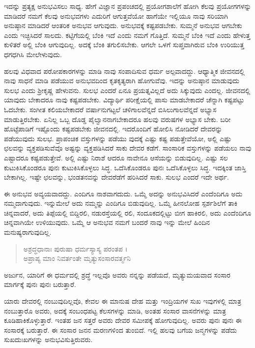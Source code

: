 ಇದನ್ನು ಪ್ರತ್ಯಕ್ಷ ಅನುಭವಿಸಲು ಸಾಧ್ಯ. ಹೇಗೆ ವಿಜ್ಞಾನ ಪ್ರಪಂಚದಲ್ಲಿ ಪ್ರಯೋಗಶಾಲೆಗೆ ಹೋಗಿ ಕೆಲವು ಪ್ರಯೋಗಗಳನ್ನು ಮಾಡಿದರೆ ನಮಗೆ ಕೆಲವು ಅನುಭವಗಳು ಎದುರಿಗೆ ಆಗುತ್ತವೆಯೋ ಹಾಗೆಯೇ ಇಲ್ಲಿಯೂ ನಾವು ಸರಿಯಾಗಿ ಅನುಷ್ಠಾನ ಮಾಡಿದರೆ ಆಂತರಿಕ ಅನುಭವ ಆಗುವುದು. ಅನುಭವಕ್ಕೆ ಕಷ್ಟಪಡಬೇಕು. ಸುಮ್ಮನೆ ಅನುಭವ ಆಗಬೇಕು ಎಂದು ಇಚ್ಛಿಸಿದರೆ ಸಾಲದು. ಕಟ್ಟಿಗೆಯಲ್ಲಿ ಬೆಂಕಿ ಇದೆ ಎಂದು ನಮಗೆ ಗೊತ್ತಿದೆ. ಸುಮ್ಮನೆ ಬೆಂಕಿ ಇದೆ ಎಂದು ಹೇಳುತ್ತ ಕುಳಿತರೆ ಅಲ್ಲಿ ಬೆಂಕಿ ಆಗುವುದಿಲ್ಲ. ಅದಕ್ಕೆ ಬೆಂಕಿ ತಗುಲಿಸಬೇಕು. ಆಗಲೇ ಒಳಗೆ ಸುಪ್ತವಾಗಿರುವ ಬೆಂಕಿ ಉರಿಯುತ್ತ ಧಗಧಗಿಸಿ ಮೇಲೇಳುವುದು.

ಹಲವು ವಿಧವಾದ ಪರೋಪಕಾರಗಳನ್ನು ಮಾಡಿ ನಾವು ಸಂಪಾದಿಸುವ ಧರ್ಮ ಅಲ್ಪವಾದದ್ದು. ಆಧ್ಯಾತ್ಮಿಕ ಜೀವನದಲ್ಲಿ ನಾವು ಸಾಧನೆ ಮಾಡಿ ಪಡೆಯುವ ಅನುಭವದಿಂದ ಕೃತಕೃತ್ಯರಾಗಿ ಹೋಗುವೆವು. ಇದನ್ನು ಅನುಷ್ಠಾನ ಮಾಡುವುದು ಸುಲಭ ಎಂದು ಶ್ರೀಕೃಷ್ಣ ಹೇಳುವನು. ಸುಲಭ ಎಂದರೆ ಏನೂ ಪ್ರಯತ್ನವಿಲ್ಲದೆ ಅದು ಸಿಕ್ಕುವುದು ಎಂದಲ್ಲ. ಜೀವನದಲ್ಲಿ ಯಾವುದು ಬೇಕಾದರೂ ನಾವು ಕಷ್ಟಪಡಬೇಕು. ವಿದ್ಯಾರ್ಥಿ ಪರೀಕ್ಷೆಯಲ್ಲಿ ಪಾಸು ಮಾಡಬೇಕಾದರೆ ಚೆನ್ನಾಗಿ ಕಷ್ಟಪಟ್ಟು ಓದಬೇಕು. ಸಂಗೀತ ಕಲಿಯಬೇಕಾದರೆ ವರ್ಷಾನುಗಟ್ಟಲೆ ಚಳಿಗಾಲವೆನ್ನದೆ ಬಿಸಿಲುಗಾಲವೆನ್ನದೆ ಅಭ್ಯಾಸ ಮಾಡುತ್ತಿರಬೇಕು. ಏನಿಲ್ಲ ಒಬ್ಬ ದೊಡ್ಡ ಪೈಲ್ವಾನನಾಗಬೇಕಾದರೂ ಹಲವು ವರುಷಗಳ ಅಭ್ಯಾಸ ಬೇಕು. ಬರೀ ಹೊಟ್ಟೆಪಾಡಿಗೆ ಇಷ್ಟೊಂದು ಕಷ್ಟಪಡಬೇಕು ಜೀವನದಲ್ಲಿ. ಇದರೊಂದಿಗೆ ಹೋಲಿಸಿ ನೋಡಿದರೆ ದೇವರನ್ನು ಪಡೆಯುವುದು ಸುಲಭ. ಪ್ರಾಪಂಚಿಕ ವಸ್ತುಗಳನ್ನು ಪಡೆಯು ವುದಕ್ಕೆ ಎಷ್ಟು ಕಷ್ಟ ಪಡುತ್ತೇವೆಯೋ, ಅಲ್ಲಿ ಎಷ್ಟು ಛಲವನ್ನು ವ್ಯಕ್ತಪಡಿಸುವೆವೊ ಅಷ್ಟನ್ನು ವ್ಯಕ್ತಪಡಿಸಿದರೆ ಸಾಕು ದೇವರ ಕಡೆಗೆ. ಸಾಂಸಾರಿಕ ವಸ್ತುಗಳನ್ನು ಪಡೆಯಲು ನಾವು ಎಷ್ಟಾದರೂ ಕಷ್ಟಪಡುತ್ತೇವೆ. ಅಲ್ಲಿ ಎಷ್ಟು ನಿರಾಶೆ ಆದರೂ ನಾವೇನೂ ಆಸೆಯನ್ನು ಬಿಡುವುದಿಲ್ಲ. ಎಷ್ಟು ಸಲ ಕುಟುಕಿಸಿಕೊಂಡರೂ ಪುನಃ ಕುಟುಕಿಸಿಕೊಳ್ಳಲು ಸಿದ್ಧ. ಒದೆಸಿಕೊಂಡರೂ ಪುನಃ ಒದೆಸಿಕೊಳ್ಳಲು ಸಿದ್ಧ. ಇದಕ್ಕಿಂತ ಜಾಸ್ತಿ ಬೇಕಾಗಿಲ್ಲ. ಇಷ್ಟೇ ಛಲವನ್ನು, ಭಂಡತನವನ್ನು ದೇವರೆಡೆಗೆ ಹರಿಸಿದರೆ ಸಾಕು. ಸುಲಭ ಎಂದರೆ ಇದೇ ಅರ್ಥ.

ಈ ಅನುಭವ ಅವ್ಯಯವಾದದ್ದು. ಎಂದಿಗೂ ನಾಶವಾಗದುದು. ಒಮ್ಮೆ ಅದನ್ನು ಅನುಭವಿಸಿದರೆ ಎಂದೆಂದಿಗೂ ಅದು ನಮ್ಮದಾಗುವುದು. ಇನ್ನುಮೇಲೆ ಅದು ನಮ್ಮನ್ನು ಎಂದಿಗೂ ಬಿಡುವುದಿಲ್ಲ. ಒಮ್ಮೆ ಹೀನಲೋಹ ಸ್ಪರ್ಶಶಿಲೆಗೆ ತಾಕಿ ಚಿನ್ನವಾದರೆ, ಅದು ತಿಪ್ಪೆಯಲ್ಲಿ ಬಿದ್ದಿರಲಿ, ನಡುರಸ್ತೆಯಲ್ಲಿ ರಲಿ, ಸಂದೂಕದಲ್ಲಿಟ್ಟು ಬೀಗ ಹಾಕಿರಲಿ, ಅದು ಎಂದೆಂದಿಗೂ ಚಿನ್ನವಾಗಿಯೇ ಉಳಿಯುವುದು. ಒಮ್ಮೆ ಆ ಅನುಭವ ನಮಗೆ ಬಂದರೆ ನಾವು ಇನ್ನು ಮೇಲೆ ಹಿಂದಿನ ಮನುಷ್ಯರಾಗುವುದಿಲ್ಲ.

\begin{verse}
ಅಶ್ರದ್ಧಧಾನಾಃ ಪುರುಷಾ ಧರ್ಮಸ್ಯಾಸ್ಯ ಪರಂತಪ ।\\ಅಪ್ರಾಪ್ಯ ಮಾಂ ನಿವರ್ತಂತೇ ಮೃತ್ಯುಸಂಸಾರವರ್ತ್ಮನಿ 
\end{verse}

{\small ಅರ್ಜುನ, ಯಾರಿಗೆ ಈ ಧರ್ಮದಲ್ಲಿ ಶ್ರದ್ಧೆ ಇಲ್ಲವೊ ಅವರು ನನ್ನನ್ನು ಪಡೆಯದೆ, ಮೃತ್ಯುಮಯವಾದ ಸಂಸಾರ ಮಾರ್ಗಕ್ಕೆ ಪುನಃ ಪುನಃ ಬರುತ್ತಾರೆ.}

ಯಾರು ದೇವರಲ್ಲಿ ನಂಬುವುದಿಲ್ಲವೊ, ಕೇವಲ ಈ ಮಾನುಷ ದೇಹ ಮತ್ತು ಇಂದ್ರಿಯಗಳ ಸುಖ ಇವುಗಳಲ್ಲಿ ಮಾತ್ರ ನಂಬುತ್ತಾರೊ ಅವರು, ಅದಕ್ಕೆ ಸಂಬಂಧಪಟ್ಟ ಕೆಲಸಗಳನ್ನು ಮಾಡಿ, ಅಂತಹ ಸಂಸಾರ ವಾಸನೆಗಳನ್ನು ಮಾತ್ರ ಕೂಡಿಹಾಕಿಕೊಳ್ಳುತ್ತಾರೆ. ಇಂತಹ ಜನ ಸತ್ತರೆ ಅವರು ದೇವರ ಸಮೀಪಕ್ಕೆ ಹೋಗುವುದಿಲ್ಲ. ಅವರು ಪುನಃ ಪುನಃ ಈ ಸಂಸಾರಕ್ಕೆ ಬರುತ್ತಾರೆ. ಈ ಸಂಸಾರ ಜನನ ಮರಣಗಳಿಂದ ತುಂಬಿದೆ. ಇಲ್ಲಿ ಹಲವು ಬಗೆಯ ಜನ್ಮಗಳನ್ನು ಪಡೆದು ಸುಖದುಃಖಗಳನ್ನು ಅನುಭವಿಸುತ್ತಿರುವರು.

